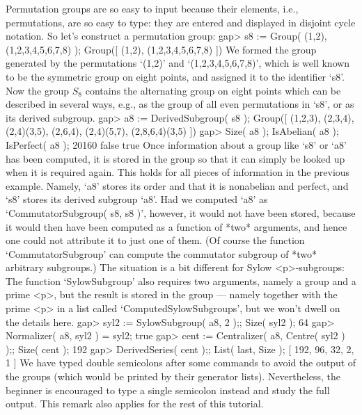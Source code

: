 Permutation  groups  are so easy to  input  because their elements, i.e.,
permutations,  are  so easy to  type: they  are  entered and displayed in
disjoint cycle notation. So let's construct a permutation group:
\beginexample
gap> s8 := Group( (1,2), (1,2,3,4,5,6,7,8) );
Group([ (1,2), (1,2,3,4,5,6,7,8) ])
\endexample
We formed the group generated by the permutations `(1,2)' and
`(1,2,3,4,5,6,7,8)', which is well known to be the symmetric group on
eight points, and assigned it to the identifier `s8'.  Now the group
$S_8$ contains the alternating group on eight points which can be
described in several ways, e.g., as the group of all even permutations
in `s8', or as its derived subgroup.
\beginexample
gap> a8 := DerivedSubgroup( s8 );
Group([ (1,2,3), (2,3,4), (2,4)(3,5), (2,6,4), (2,4)(5,7), (2,8,6,4)(3,5) ])
gap> Size( a8 ); IsAbelian( a8 ); IsPerfect( a8 );
20160
false
true
\endexample
Once information about a group like `s8' or `a8' has been computed, it
is stored in the group so that  it can simply be looked  up when it is
required  again.   This holds for  all pieces   of  information in the
previous  example.  Namely,  `a8'  stores its  order and  that   it is
nonabelian  and perfect,  and `s8'  stores its  derived subgroup `a8'.
Had we computed `a8' as  `CommutatorSubgroup( s8,  s8 )', however,  it
would not have been stored,  because it would  then have been computed
as a function of *two* arguments, and hence one could not attribute it
to just one of them. (Of course  the function `CommutatorSubgroup' can
compute the commutator  subgroup  of *two* arbitrary  subgroups.)  The
situation is  a bit  different for  Sylow  <p>-subgroups: The function
`SylowSubgroup' also  requires  two arguments,  namely a   group and a
prime <p>, but the result is  stored in the  group --- namely together
with the prime  <p> in a  list called `ComputedSylowSubgroups', but we
won't dwell on the details here.
\beginexample
gap> syl2 := SylowSubgroup( a8, 2 );; Size( syl2 );
64
gap> Normalizer( a8, syl2 ) = syl2;
true
gap> cent := Centralizer( a8, Centre( syl2 ) );; Size( cent );
192
gap> DerivedSeries( cent );; List( last, Size );
[ 192, 96, 32, 2, 1 ]
\endexample
We have typed double semicolons  after some commands  to avoid the output
of the  groups   (which would  be  printed  by their  generator   lists).
Nevertheless, the beginner  is  encouraged to   type  a single  semicolon
instead and study the full output. This  remark also applies for the rest
of this tutorial.

